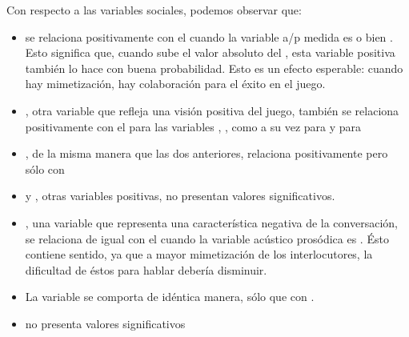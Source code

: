 Con respecto a las variables sociales, podemos observar que:

\begin{itemize}
  \item \svcontributes se relaciona positivamente con el \absentrainment cuando la variable a/p medida es \FOMEAN o bien \NOISETOHARMONICS. Esto significa que, cuando sube el valor absoluto del \entrainment, esta variable positiva también lo hace con buena probabilidad. Esto es un efecto esperable: cuando hay mimetización, hay colaboración para el éxito en el juego.
  \item \svclear, otra variable que refleja una visión positiva del juego, también se relaciona positivamente con el \absentrainment para las variables \FOMEAN, \NOISETOHARMONICS, \ENGMAX como a su vez para \PHONAVG y para \SYLCOUNT
  \item \svengaged, de la misma manera que las dos anteriores, relaciona positivamente pero sólo con \FOMEAN
  \item \svplanning y \svencourages, otras variables positivas, no presentan valores significativos.
  \item \svdifficult, una variable que representa una característica negativa de la conversación, se relaciona de igual con el \absentrainment cuando la variable acústico prosódica es \ENGMAX. Ésto contiene sentido, ya que a mayor mimetización de los interlocutores, la dificultad de éstos para hablar debería disminuir.
  \item La variable \svbored se comporta de idéntica manera, sólo que con \FOMEAN.
  \item \svdislikes no presenta valores significativos
\end{itemize}







